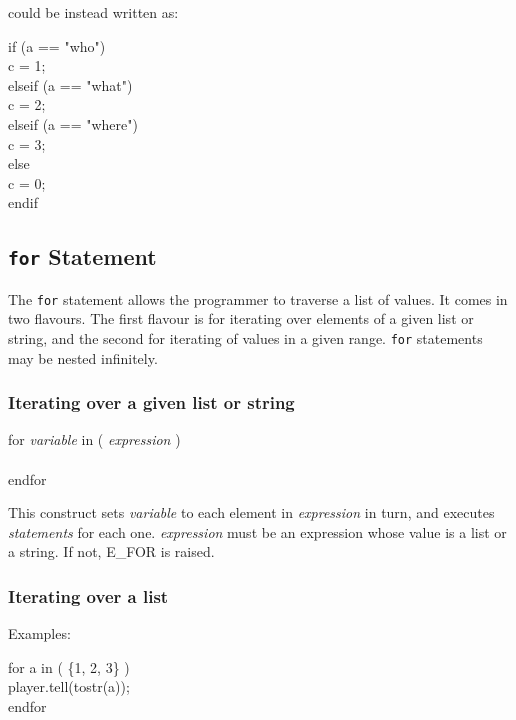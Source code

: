 could be instead written as:

\begin{code}
if (a == "who") \\
\ind c = 1; \\
elseif (a == "what") \\
\ind c = 2; \\
elseif (a == "where") \\
\ind c = 3; \\
else \\
\ind c = 0; \\
endif
\end{code}

\subsection{{\tt for} Statement}

The {\tt for} statement allows the programmer to traverse a list of
values.  It comes in two flavours.  The first flavour is for iterating
over elements of a given list or string, and the second for iterating
of values in a given range.  {\tt for} statements may be nested infinitely.


\subsubsection{Iterating over a given list or string}

\begin{code}
for {\em variable } in ( {\em expression } ) \\
 \\
endfor
\end{code}

This construct sets {\em variable } to each element in
{\em expression } in turn, and executes {\em statements } for
each one.  {\em expression} must be an expression whose value
is a list or a string.  If not, {\error E\_FOR} is raised.

\subsubsection{Iterating over a list}

Examples:

\begin{code}
for a in ( \{1, 2, 3\} ) \\
\ind player.tell(tostr(a)); \\
endfor
\end{code}

